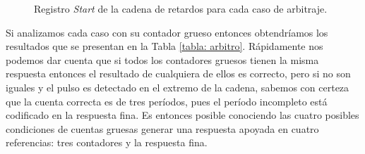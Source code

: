 \begin{figure}[H]
      \caption{Registro \textit{Start} de la cadena de retardos para cada caso de arbitraje.}
      \label{fig: finos_casos_start}
\end{figure}

Si analizamos cada caso con su contador grueso entonces obtendríamos los resultados que se presentan en la Tabla \ref{tabla: arbitro}.
Rápidamente nos podemos dar cuenta que si todos los contadores gruesos tienen la misma respuesta entonces el resultado de cualquiera de ellos es correcto,
pero si no son iguales y el pulso es detectado en el extremo de la cadena, sabemos con certeza que la cuenta correcta es de tres períodos,
pues el período incompleto está codificado en la respuesta fina. Es entonces posible conociendo las cuatro posibles condiciones de cuentas gruesas generar 
una respuesta apoyada en cuatro referencias: tres contadores y la respuesta fina.

